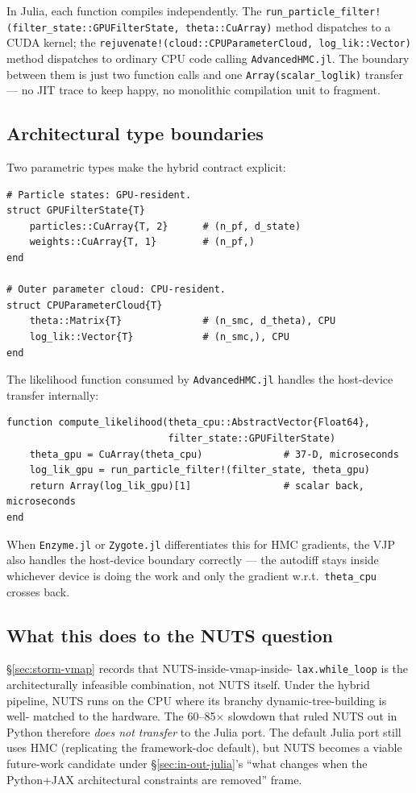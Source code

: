 \documentclass[11pt,a4paper]{article}
\begin{document}
In Julia, each function compiles independently. The
\texttt{run\_particle\_filter!(filter\_state::GPUFilterState,
theta::CuArray)} method dispatches to a CUDA kernel; the
\texttt{rejuvenate!(cloud::CPUParameterCloud, log\_lik::Vector)}
method dispatches to ordinary CPU code calling
\texttt{AdvancedHMC.jl}. The boundary between them is just two
function calls and one \texttt{Array(scalar\_loglik)} transfer ---
no JIT trace to keep happy, no monolithic compilation unit to
fragment.

\subsection{Architectural type boundaries}

Two parametric types make the hybrid contract explicit:
\begin{lstlisting}
# Particle states: GPU-resident.
struct GPUFilterState{T}
    particles::CuArray{T, 2}      # (n_pf, d_state)
    weights::CuArray{T, 1}        # (n_pf,)
end

# Outer parameter cloud: CPU-resident.
struct CPUParameterCloud{T}
    theta::Matrix{T}              # (n_smc, d_theta), CPU
    log_lik::Vector{T}            # (n_smc,), CPU
end
\end{lstlisting}
The likelihood function consumed by \texttt{AdvancedHMC.jl}
handles the host-device transfer internally:
\begin{lstlisting}
function compute_likelihood(theta_cpu::AbstractVector{Float64},
                            filter_state::GPUFilterState)
    theta_gpu = CuArray(theta_cpu)              # 37-D, microseconds
    log_lik_gpu = run_particle_filter!(filter_state, theta_gpu)
    return Array(log_lik_gpu)[1]                # scalar back, microseconds
end
\end{lstlisting}
When \texttt{Enzyme.jl} or \texttt{Zygote.jl} differentiates this
for HMC gradients, the VJP also handles the host-device boundary
correctly --- the autodiff stays inside whichever device is doing
the work and only the gradient w.r.t.\ \texttt{theta\_cpu}
crosses back.

\subsection{What this does to the NUTS question}

§\ref{sec:storm-vmap} records that NUTS-inside-vmap-inside-
\texttt{lax.while\_loop} is the architecturally infeasible
combination, not NUTS itself. Under the hybrid pipeline, NUTS runs
on the CPU where its branchy dynamic-tree-building is well-
matched to the hardware. The 60--85$\times$ slowdown that ruled
NUTS out in Python therefore \emph{does not transfer} to the
Julia port. The default Julia port still uses HMC (replicating the
framework-doc default), but NUTS becomes a viable future-work
candidate under §\ref{sec:in-out-julia}'s ``what changes when the
Python+JAX architectural constraints are removed'' frame.
\end{document}
